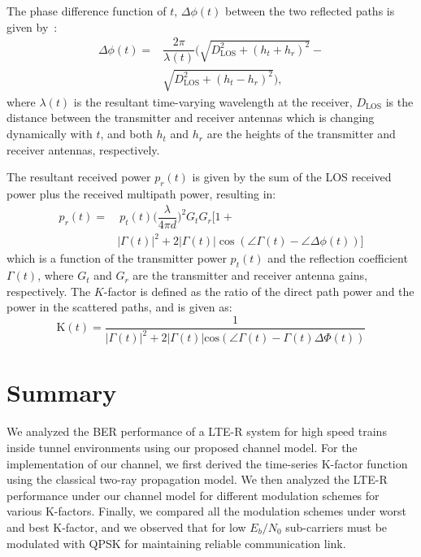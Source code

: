 The phase difference function of $t$, $\Delta\phi(t)$ between the two reflected paths is given by~\cite{booklter11}:
\begin{equation}
\begin{split}
\Delta\phi(t) =& \dfrac{2\pi}{\lambda(t)}\bigg(\sqrt{D_{\textrm{LOS}}^2+(h_t+h_r)^2}-\\
& \sqrt{D_{\textrm{LOS}}^2+(h_t-h_r)^2}\bigg),
\end{split}
\end{equation}
where $\lambda(t)$ is the resultant time-varying wavelength at the receiver, $D_{\textrm{LOS}}$ is the distance between the transmitter and receiver antennas which is changing dynamically with $t$, and both $h_t$ and $h_r$ are the heights of the transmitter and receiver antennas, respectively.
 
The resultant received power $p_r(t)$ is given by the sum of the LOS received power plus the received multipath power, resulting in:
\begin{equation}
\begin{split}
p_r(t) =& ~p_t(t)\bigg(\dfrac{\lambda}{4\pi d}\bigg)^2G_t G_r\bigg[1+\\
& |\Gamma(t)|^2+2|\Gamma(t)|\cos(\angle\Gamma(t)-\angle\Delta\phi(t))\bigg]
\end{split}
\end{equation}
which is a function of the transmitter power $p_t(t)$ and the reflection coefficient $\Gamma(t)$, where $G_t$ and $G_r$ are the transmitter and receiver antenna gains,  respectively.
The $K$-factor is defined as the ratio of the direct path power and the power in the scattered paths, and is given as:
\begin{equation}
\label{kfactor}
\mathrm{K}(t) = \dfrac{1}{|\Gamma(t)|^2+2|\Gamma(t)|\textrm{cos}(\angle \Gamma(t)-\Gamma(t)\Delta\Phi(t))}
\end{equation}

\section{Summary}
We analyzed the BER performance of a LTE-R system for high speed trains inside tunnel environments using our proposed channel model. For the implementation
of our channel, we first derived the time-series K-factor function using the classical two-ray propagation model. We then analyzed the LTE-R performance under our channel model for different modulation schemes for various K-factors. Finally, we compared all the modulation schemes under worst and best K-factor, and we observed that for low $E_b/N_0$
sub-carriers must be modulated with QPSK for maintaining reliable communication link.

